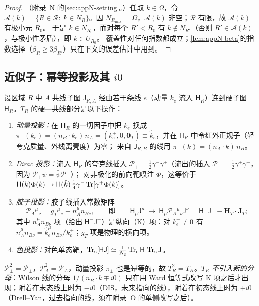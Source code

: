 \begin{proof}
（附录~N 的\cref{sec:appN-setting}。）任取 $k\in\Omega$，令 $\mathcal A(k)=\{R\in\mathcal R:\ k\in N_R\}$。因 $N_{R_{\max}}=\Omega$，$\mathcal A(k)$ 非空；$\mathcal R$ 有限，故 $\mathcal A(k)$ 有极小元 $R_0$。
于是 $k\in N_{R_0}$，而对每个 $R'<R_0$ 有 $k\notin N_{R'}$（否则 $R'\in\mathcal A(k)$，与极小性矛盾），即 $k\in U_{R_0}$。
覆盖性对任何指数都成立；\cref{lem:appN-beta}的指数选择（$\beta_R\ge3\beta_{R'}$）只在下文的误差估计中用到。
\end{proof}

\subsection{近似子：幂等投影及其 $i0$}

\begin{definition}\label{def:method-collinear-approx}
设区域 $R$ 中 $A$ 共线子图 $\mathsf J_{R,A}$ 经由若干条线 $e$（动量 $k_e$ 流入 $\mathsf H_R$）连到硬子图 $\mathsf H_R$。$T_R$ 的硬—共线部分是以下操作：
\begin{enumerate}[label=(\roman*),leftmargin=2em,itemsep=1pt,topsep=2pt]
\item \emph{动量投影：}在 $\mathsf H_R$ 的一切因子中把 $k_e$ 换成 $\pi_+(k_e)=(n_B\cdot k_e)\,n_A=(k_e^+,0,\mathbf 0_T)\equiv\hat k_e$，并在 $\mathsf H_R$ 中令红外正规子（轻夸克质量、外线离壳度）为零；
  来自 $\mathsf J_{R,B}$ 的线用 $\pi_-(k)=(n_A\cdot k)\,n_B$。
\item \emph{Dirac 投影：}流入 $\mathsf H_R$ 的夸克线插入 $\mathcal P_+=\frac12\gamma^-\gamma^+$（流出的插入 $\mathcal P_-=\frac12\gamma^+\gamma^-$，因为 $\overline{\mathcal P_+\psi}=\bar\psi\mathcal P_-$）；
  对非极化的前向靶喷注 $\Phi$，这等价于 $\mathsf H(k)\Phi(k)\to\mathsf H(\hat k)\,\frac14\gamma^-\operatorname{Tr}[\gamma^+\Phi(k)]$。
\item \emph{胶子投影：}胶子线插入常数矩阵
  \begin{equation}\label{eq:method-PA}
  \mathcal P_A{}^\mu{}_\nu=g_T{}^\mu{}_\nu+n_A^\mu n_{B\nu},\qquad\text{即}\qquad \mathsf H_\mu\mathsf J^\mu\ \to\ \mathsf H_\mu\mathcal P_A{}^\mu{}_\nu\mathsf J^\nu=\mathsf H^-\mathsf J^+-\mathbf H_T\cdot\mathbf J_T ;
  \end{equation}
  其中 $n_A^\mu n_{B\nu}$ 项（给出 $\mathsf H^-\mathsf J^+$）是纵向（K）项：对 $k_e^+\neq0$ 有 $n_A^\mu n_{B\nu}=\hat k_e^\mu n_{B\nu}/k_e^+$；$g_T$ 项是物理的横向项。
\item \emph{色投影：}对色单态靶，$\operatorname{Tr}_{\mathrm{c}}[\mathsf H\mathsf J]\simeq\frac1{N_c}\operatorname{Tr}_{\mathrm{c}}\mathsf H\,\operatorname{Tr}_{\mathrm{c}}\mathsf J$。
\end{enumerate}
$\mathcal P_\pm^2=\mathcal P_\pm$，$\mathcal P_A^2=\mathcal P_A$，动量投影 $\pi_\pm$ 也是幂等的，故 $T_R^2=T_R$。$T_R$ \emph{不引入新的分母}：Wilson 线的分母 $1/(n_B\cdot k\mp i0)$
只在用 Ward 恒等式改写 K 项之后才出现；附着在末态线上时为 $-i0$（DIS，未来指向的线），附着在初态线上时为 $+i0$（Drell--Yan，过去指向的线，须在附录~O 的单侧改写之后）。
\end{definition}

